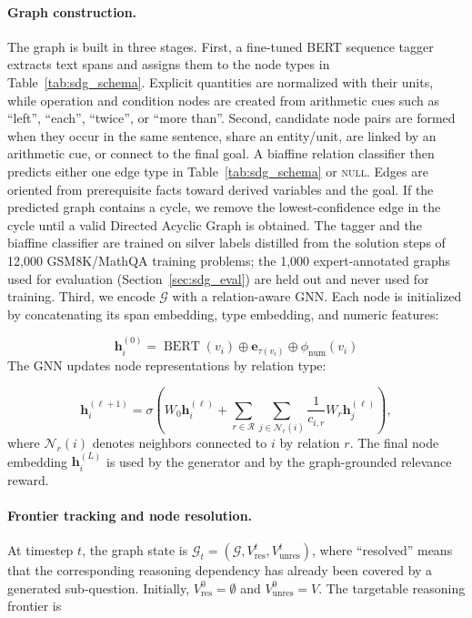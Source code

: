 \documentclass[sigconf, anonymous, review, screen]{acmart}
\begin{document}
\paragraph{Graph construction.}
The graph is built in three stages. First, a fine-tuned BERT sequence tagger extracts text spans and
assigns them to the node types in Table~\ref{tab:sdg_schema}. Explicit quantities are normalized with
their units, while operation and condition nodes are created from arithmetic cues such as
``left'', ``each'', ``twice'', or ``more than''. Second, candidate node pairs are formed when they occur
in the same sentence, share an entity/unit, are linked by an arithmetic cue, or connect to the final
goal. A biaffine relation classifier then predicts either one edge type in
Table~\ref{tab:sdg_schema} or \textsc{null}. Edges are oriented from prerequisite facts toward derived
variables and the goal. If the predicted graph contains a cycle, we remove the lowest-confidence edge
in the cycle until a valid Directed Acyclic Graph is obtained. The tagger and the biaffine classifier
are trained on silver labels distilled from the solution steps of 12{,}000 GSM8K/MathQA training
problems; the 1{,}000 expert-annotated graphs used for evaluation (Section~\ref{sec:sdg_eval}) are
held out and never used for training. Third, we encode $\mathcal{G}$ with a relation-aware GNN.
Each node is initialized by concatenating its span embedding, type embedding, and numeric features:

\[
\mathbf{h}^{(0)}_i = \operatorname{BERT}(v_i) \oplus \mathbf{e}_{\tau(v_i)} \oplus \phi_{\mathrm{num}}(v_i)
\]
The GNN updates node representations by relation type:

\[
\mathbf{h}^{(\ell+1)}_i =
\sigma\!\left(
W_0\mathbf{h}^{(\ell)}_i+
\sum_{r\in\mathcal{R}}\sum_{j\in\mathcal{N}_r(i)}
\frac{1}{c_{i,r}}W_r\mathbf{h}^{(\ell)}_j
\right),
\]
where $\mathcal{N}_r(i)$ denotes neighbors connected to $i$ by relation $r$. The final node embedding
$\mathbf{h}^{(L)}_i$ is used by the generator and by the graph-grounded relevance reward.

\paragraph{Frontier tracking and node resolution.}
At timestep $t$, the graph state is
$\mathcal{G}_t=(\mathcal{G},V^t_{\mathrm{res}},V^t_{\mathrm{unres}})$, where ``resolved'' means that
the corresponding reasoning dependency has already been covered by a generated sub-question. Initially,
$V^0_{\mathrm{res}}=\emptyset$ and $V^0_{\mathrm{unres}}=V$. The targetable reasoning frontier is
\end{document}
